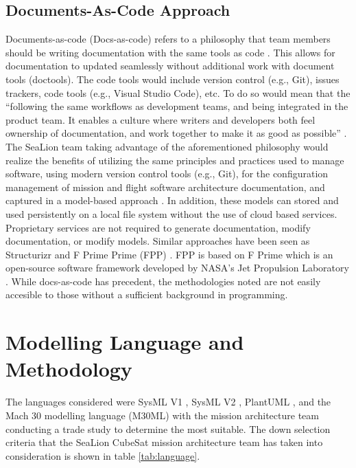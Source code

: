 \documentclass[journal,article,submit,pdftex,moreauthors]{Definitions/mdpi}
\begin{document}
\subsection{Documents-As-Code Approach}
Documents-as-code (Docs-as-code) refers to a philosophy that team members should be writing documentation with the same tools as code \cite{ibm_mbse}.  This allows for documentation to updated seamlessly without additional work with document tools (doctools).  The code tools would include version control (e.g., Git), issues trackers, code tools (e.g., Visual Studio Code), etc.  To do so would mean that the “following the same workflows as development teams, and being integrated in the product team. It enables a culture where writers and developers both feel ownership of documentation, and work together to make it as good as possible” \cite{ibm_mbse}.  The SeaLion team taking advantage of the aforementioned philosophy would realize the benefits of utilizing the same principles and practices used to manage software, using modern version control tools (e.g., Git), for the configuration management of mission and flight software architecture documentation, and captured in a model-based approach \cite{ibm_mbse}.  In addition, these models can stored and used persistently on a local file system without the use of cloud based services.  Proprietary services are not required to generate documentation, modify documentation, or modify models.  Similar approaches have been seen as Structurizr \cite{structurizr} and F Prime Prime (FPP) \cite{f_prime_prime}.  FPP is based on F Prime which is an open-source software framework developed by NASA's Jet Propulsion Laboratory \cite{f_prime}.  While docs-as-code has precedent, the methodologies noted are not easily accesible to those without a sufficient background in programming.

\section{Modelling Language and Methodology}
The languages considered were SysML V1 \cite{sys_ml}, SysML V2 \cite{sys_ml2}, PlantUML \cite{plantuml}, and the Mach 30 modelling language (M30ML) \cite{mach30_git} with the mission architecture team conducting a trade study to determine the most suitable.  The down selection criteria that the SeaLion CubeSat mission architecture team has taken into consideration is shown in table \ref{tab:language}.
\end{document}
